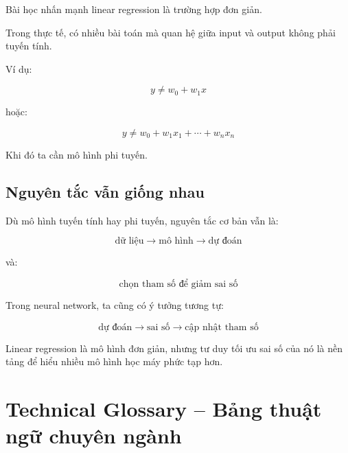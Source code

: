 Bài học nhấn mạnh linear regression là trường hợp đơn giản.

Trong thực tế, có nhiều bài toán mà quan hệ giữa input và output không phải tuyến tính.

Ví dụ:

\[
    y \neq w_0+w_1x
\]

hoặc:

\[
    y \neq w_0+w_1x_1+\cdots+w_nx_n
\]

Khi đó ta cần mô hình phi tuyến.

\subsection{Nguyên tắc vẫn giống nhau}

Dù mô hình tuyến tính hay phi tuyến, nguyên tắc cơ bản vẫn là:

\[
    \text{dữ liệu}
    \rightarrow
    \text{mô hình}
    \rightarrow
    \text{dự đoán}
\]

và:

\[
    \text{chọn tham số để giảm sai số}
\]

Trong neural network, ta cũng có ý tưởng tương tự:

\[
    \text{dự đoán}
    \rightarrow
    \text{sai số}
    \rightarrow
    \text{cập nhật tham số}
\]

\begin{ghinho}
Linear regression là mô hình đơn giản, nhưng tư duy tối ưu sai số của nó là nền tảng để hiểu nhiều mô hình học máy phức tạp hơn.
\end{ghinho}

\section{Technical Glossary -- Bảng thuật ngữ chuyên ngành}

